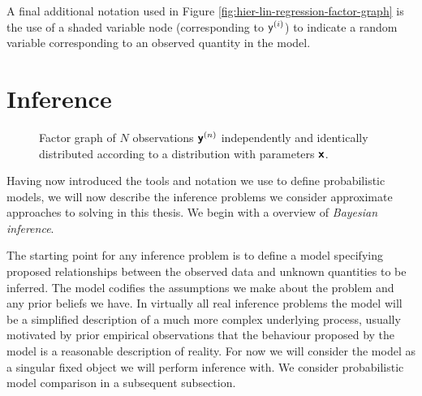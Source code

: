 A final additional notation used in Figure \ref{fig:hier-lin-regression-factor-graph} is the use of a shaded variable node (corresponding to $\mathsf{y}^{(i)}$) to indicate a random variable corresponding to an observed quantity in the model.

\newpage

\section{Inference}

\begin{figure}	
\centering
{}
\caption[Factor graph of \acs{iid} observed variables.]{Factor graph of $N$ observations $\boldsymbol{\mathsf{y}}^{(n)}$ independently and identically distributed according to a distribution with parameters $\boldsymbol{\mathsf{x}}$.}
\label{fig:simple-iid-factor-graph}
\end{figure}

Having now introduced the tools and notation we use to define probabilistic models, we will now describe the inference problems we consider approximate approaches to solving in this thesis. We begin with a overview of \emph{Bayesian inference}.



The starting point for any inference problem is to define a model specifying proposed relationships between the observed data and unknown quantities to be inferred. The model codifies the assumptions we make about the problem and any prior beliefs we have. In virtually all real inference problems the model will be a simplified description of a much more complex underlying process, usually motivated by prior empirical observations that the behaviour proposed by the model is a reasonable description of reality. For now we will consider the model as a singular fixed object we will perform inference with. We consider probabilistic model comparison in a subsequent subsection.

